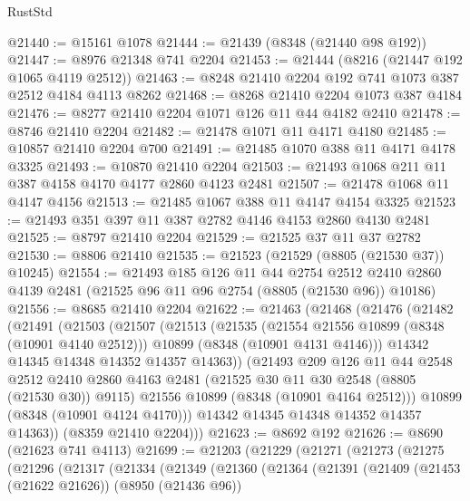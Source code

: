 \begin{lexlean}{RustStd}
\begin{coremodule}
@21440 := @15161 @1078
@21444 := @21439 (@8348 (@21440 @98 @192))
@21447 := @8976 @21348 @741 @2204
@21453 := @21444 (@8216 (@21447 @192 @1065 @4119 @2512))
@21463 := @8248 @21410 @2204 @192 @741 @1073 @387 @2512 @4184 @4113 @8262
@21468 := @8268 @21410 @2204 @1073 @387 @4184
@21476 := @8277 @21410 @2204 @1071 @126 @11 @44 @4182 @2410
@21478 := @8746 @21410 @2204
@21482 := @21478 @1071 @11 @4171 @4180
@21485 := @10857 @21410 @2204 @700
@21491 := @21485 @1070 @388 @11 @4171 @4178 @3325
@21493 := @10870 @21410 @2204
@21503 := @21493 @1068 @211 @11 @387 @4158 @4170 @4177 @2860 @4123 @2481
@21507 := @21478 @1068 @11 @4147 @4156
@21513 := @21485 @1067 @388 @11 @4147 @4154 @3325
@21523 := @21493 @351 @397 @11 @387 @2782 @4146 @4153 @2860 @4130 @2481
@21525 := @8797 @21410 @2204
@21529 := @21525 @37 @11 @37 @2782
@21530 := @8806 @21410
@21535 := @21523 (@21529 (@8805 (@21530 @37)) @10245)
@21554 := @21493
    @185
    @126
    @11
    @44
    @2754
    @2512
    @2410
    @2860
    @4139
    @2481
    (@21525 @96 @11 @96 @2754 (@8805 (@21530 @96)) @10186)
@21556 := @8685 @21410 @2204
@21622 := @21463
    (@21468
      (@21476
        (@21482
          (@21491
            (@21503
              (@21507
                (@21513
                  (@21535
                    (@21554 @21556 @10899 (@8348 (@10901 @4140 @2512)))
                    @10899
                    (@8348 (@10901 @4131 @4146)))
                  @14342
                  @14345
                  @14348
                  @14352
                  @14357
                  @14363))
              (@21493
                @209
                @126
                @11
                @44
                @2548
                @2512
                @2410
                @2860
                @4163
                @2481
                (@21525 @30 @11 @30 @2548 (@8805 (@21530 @30)) @9115)
                @21556
                @10899
                (@8348 (@10901 @4164 @2512)))
              @10899
              (@8348 (@10901 @4124 @4170)))
            @14342
            @14345
            @14348
            @14352
            @14357
            @14363))
        (@8359 @21410 @2204)))
@21623 := @8692 @192
@21626 := @8690 (@21623 @741 @4113)
@21699 := @21203
    (@21229
      (@21271
        (@21273
          (@21275
            (@21296
              (@21317
                (@21334
                  (@21349
                    (@21360
                      (@21364
                        (@21391
                          (@21409
                            (@21453 (@21622 @21626))
                            (@8950 (@21436 @96))

\end{coremodule}
\end{lexlean}
